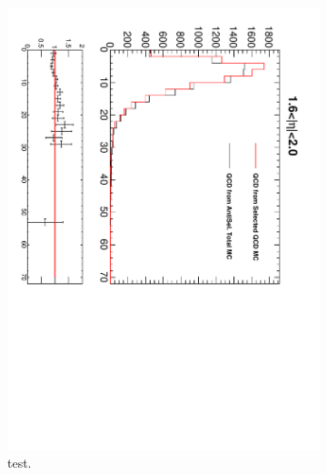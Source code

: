 \begin{figure}[htbp]
\begin{subfigure}{0.45\textwidth}
    \includegraphics*[trim = 0mm 0mm 15mm 0mm, clip, width=\textwidth, angle=90]{MetCompare_anti_eta5.pdf}
    \caption{test.}
    \label{fig:qcd_met_eta5}
  \end{subfigure}
  \begin{subfigure}{0.45\textwidth}
    \centering

\end{subfigure}
\end{figure}
